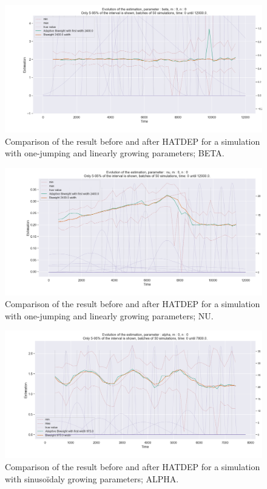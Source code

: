 \begin{figure}
\centering
\includegraphics[width = 0.90 \textwidth]{../imag/chap3/3_bis/Q.png}
\caption{Comparison of the result before and after HATDEP for a simulation with one-jumping and linearly growing parameters; BETA.}
\label{fig:second_estimate_3_beta}
\end{figure}

\begin{figure}
\centering
\includegraphics[width = 0.90 \textwidth]{../imag/chap3/3_bis/R.png}
\caption{Comparison of the result before and after HATDEP for a simulation with one-jumping and linearly growing parameters; NU.}
\label{fig:second_estimate_3_nu}
\end{figure}




\begin{figure}
\centering
\includegraphics[width = 0.90 \textwidth]{../imag/chap3/4_bis/P.png}
\caption{Comparison of the result before and after HATDEP for a simulation with sinusoïdaly growing parameters; ALPHA.}
\label{fig:second_estimate_4_alpha}
\end{figure}

